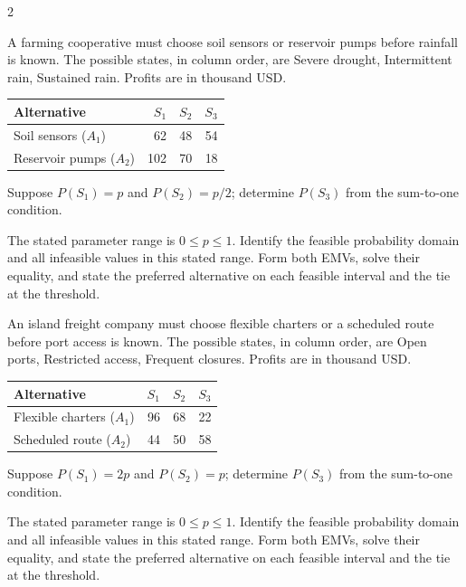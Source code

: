 \begin{multicols}{2}
\begin{minipage}{\linewidth}
A farming cooperative must choose soil sensors or reservoir pumps before rainfall is known. The possible states, in column order, are Severe drought, Intermittent rain, Sustained rain. Profits are in thousand USD.
\begin{center}\small\setlength{\tabcolsep}{4pt}
\begin{tabular}{@{}lrrr@{}}\toprule
Alternative&$S_1$&$S_2$&$S_3$\\\midrule
Soil sensors ($A_1$)&62&48&54\\
Reservoir pumps ($A_2$)&102&70&18\\\bottomrule
\end{tabular}\end{center}
Suppose $P(S_1)=p$ and $P(S_2)=p/2$; determine $P(S_3)$ from the sum-to-one condition.

The stated parameter range is $0\le p\le1$. Identify the feasible probability domain and all infeasible values in this stated range. Form both EMVs, solve their equality, and state the preferred alternative on each feasible interval and the tie at the threshold. 
\end{minipage}\par

\begin{minipage}{\linewidth}
An island freight company must choose flexible charters or a scheduled route before port access is known. The possible states, in column order, are Open ports, Restricted access, Frequent closures. Profits are in thousand USD.
\begin{center}\small\setlength{\tabcolsep}{4pt}
\begin{tabular}{@{}lrrr@{}}\toprule
Alternative&$S_1$&$S_2$&$S_3$\\\midrule
Flexible charters ($A_1$)&96&68&22\\
Scheduled route ($A_2$)&44&50&58\\\bottomrule
\end{tabular}\end{center}
Suppose $P(S_1)=2p$ and $P(S_2)=p$; determine $P(S_3)$ from the sum-to-one condition.

The stated parameter range is $0\le p\le1$. Identify the feasible probability domain and all infeasible values in this stated range. Form both EMVs, solve their equality, and state the preferred alternative on each feasible interval and the tie at the threshold. 
\end{minipage}\par
\end{multicols}

